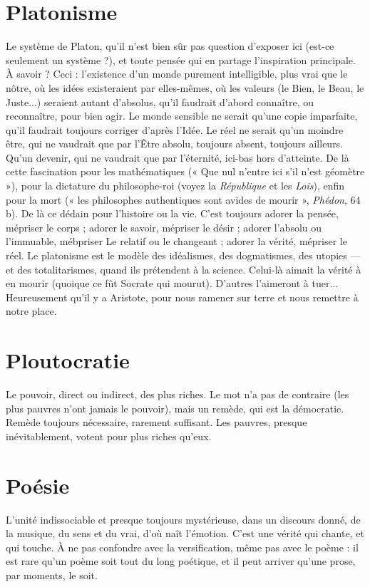 \section{Platonisme}
Le système de Platon, qu’il n’est bien sûr pas question d’exposer
ici (est-ce seulement un système ?), et toute pensée
qui en partage l'inspiration principale. À savoir ? Ceci : l'existence d’un monde
purement intelligible, plus vrai que le nôtre, où les idées existeraient par elles-mêmes,
où les valeurs (le Bien, le Beau, le Juste...) seraient autant d’absolus,
qu’il faudrait d’abord connaître, ou reconnaître, pour bien agir. Le monde sensible
ne serait qu’une copie imparfaite, qu’il faudrait toujours corriger d’après
l’Idée. Le réel ne serait qu’un moindre être, qui ne vaudrait que par l'Être
absolu, toujours absent, toujours ailleurs. Qu'un devenir, qui ne vaudrait que
par l'éternité, ici-bas hors d’atteinte. De là cette fascination pour les mathématiques
(« Que nul n’entre ici s’il n’est géomètre »), pour la dictature du philosophe-roi
(voyez la {\it République} et les {\it Lois}), enfin pour la mort (« les philosophes
authentiques sont avides de mourir », {\it Phédon}, 64 b). De là ce dédain pour l’histoire
ou la vie. C’est toujours adorer la pensée, mépriser le corps ; adorer le
savoir, mépriser le désir ; adorer l'absolu ou l’immuable, mébpriser Le relatif ou
le changeant ; adorer la vérité, mépriser le réel. Le platonisme est le modèle des
idéalismes, des dogmatismes, des utopies — et des totalitarismes, quand ils prétendent
à la science. Celui-là aimait la vérité à en mourir (quoique ce fût
Socrate qui mourut). D’autres l’aimeront à tuer... Heureusement qu'il y a
Aristote, pour nous ramener sur terre et nous remettre à notre place.

\section{Ploutocratie}
Le pouvoir, direct ou indirect, des plus riches. Le mot n'a
pas de contraire (les plus pauvres n’ont jamais le pouvoir),
mais un remède, qui est la démocratie. Remède toujours nécessaire, rarement suffisant.
Les pauvres, presque inévitablement, votent pour plus riches qu'eux.

\section{Poésie}
L'unité indissociable et presque toujours mystérieuse, dans un discours
donné, de la musique, du sens et du vrai, d’où naît l'émotion.
C’est une vérité qui chante, et qui touche. À ne pas confondre avec la versification,
même pas avec le poème : il est rare qu’un poème soit tout du long poétique,
et il peut arriver qu’une prose, par moments, le soit.

